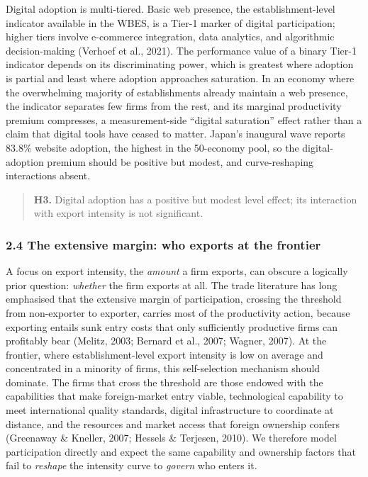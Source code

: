 \documentclass[
  12pt,a4paper]{article}
\begin{document}
Digital adoption is multi-tiered. Basic web presence, the
establishment-level indicator available in the WBES, is a Tier-1 marker
of digital participation; higher tiers involve e-commerce integration,
data analytics, and algorithmic decision-making (Verhoef et al., 2021).
The performance value of a binary Tier-1 indicator depends on its
discriminating power, which is greatest where adoption is partial and
least where adoption approaches saturation. In an economy where the
overwhelming majority of establishments already maintain a web presence,
the indicator separates few firms from the rest, and its marginal
productivity premium compresses, a measurement-side ``digital
saturation'' effect rather than a claim that digital tools have ceased
to matter. Japan's inaugural wave reports 83.8\% website adoption, the
highest in the 50-economy pool, so the digital-adoption premium should
be positive but modest, and curve-reshaping interactions absent.

\begin{quote}
\textbf{H3.} Digital adoption has a positive but modest level effect;
its interaction with export intensity is not significant.
\end{quote}

\hypertarget{the-extensive-margin-who-exports-at-the-frontier}{%
\subsubsection{2.4 The extensive margin: who exports at the
frontier}\label{the-extensive-margin-who-exports-at-the-frontier}}

A focus on export intensity, the \emph{amount} a firm exports, can
obscure a logically prior question: \emph{whether} the firm exports at
all. The trade literature has long emphasised that the extensive margin
of participation, crossing the threshold from non-exporter to exporter,
carries most of the productivity action, because exporting entails sunk
entry costs that only sufficiently productive firms can profitably bear
(Melitz, 2003; Bernard et al., 2007; Wagner, 2007). At the frontier,
where establishment-level export intensity is low on average and
concentrated in a minority of firms, this self-selection mechanism
should dominate. The firms that cross the threshold are those endowed
with the capabilities that make foreign-market entry viable,
technological capability to meet international quality standards,
digital infrastructure to coordinate at distance, and the resources and
market access that foreign ownership confers (Greenaway \& Kneller,
2007; Hessels \& Terjesen, 2010). We therefore model participation
directly and expect the same capability and ownership factors that fail
to \emph{reshape} the intensity curve to \emph{govern} who enters it.
\end{document}
